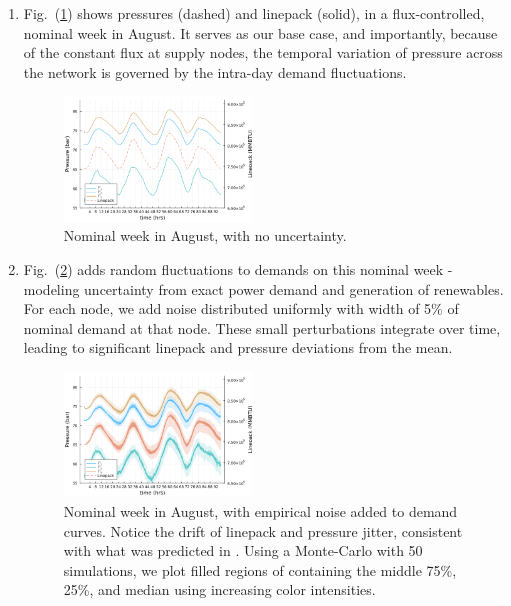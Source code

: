 \begin{enumerate}
    \item Fig.~(\ref{fig:scen1}) shows pressures (dashed) and linepack (solid), in a flux-controlled, nominal week in August. It serves as our base case, and importantly, because of the constant flux at supply nodes, the temporal variation of pressure across the network is governed by the intra-day demand fluctuations.
\begin{figure}
    \centering
    \includegraphics[width=0.47\textwidth]{figs/ScenarioResults/scen1.png}
    \caption{Nominal week in August, with no uncertainty.}
    \label{fig:scen1}
\end{figure}

    \item Fig.~(\ref{fig:scen2}) adds random fluctuations to demands on this nominal week - modeling uncertainty from exact power demand and generation of renewables. For each node, we add noise distributed uniformly with width of 5\% of nominal demand at that node. These small perturbations integrate over time, leading to significant linepack and pressure deviations from the mean.
    \begin{figure}
    \centering
    \includegraphics[width=0.47\textwidth]{figs/ScenarioResults/scen2.png}
    \caption{Nominal week in August, with empirical noise added to demand curves. Notice the drift of linepack and pressure jitter, consistent with what was predicted in \cite{chertkov_cascading_2014}. Using a Monte-Carlo with 50 simulations, we plot filled regions of containing the middle 75\%, 25\%, and median using increasing color intensities.}
    \label{fig:scen2}
\end{figure}


\end{enumerate}
